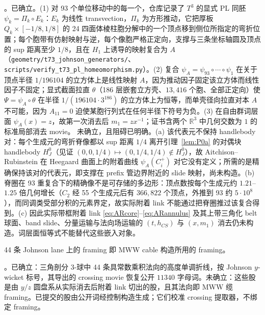 \begin{remark}
\Open。已确立。(1) 对 93 个单位移动中的每一个，仓库记录了 $T^3$ 的显式 PL 同胚 $\psi_k=\Pi_k\circ E_k$：$E_k$ 为线性 transvection，$\Pi_k$ 为方形推动，它把厚板 $Q_k\times[-1/8,1/8]$ 的 24 四面体棱柱胞分解中的一个顶点移到侧位所指定的弯折位置；每个胞带有仿射映射与逆，每个像胞严格正定向，支撑与三条坐标轴圆及顶点的 sup 距离至少 $1/8$，且在 $H_1$ 上诱导的映射复合为 $A$（\texttt{geometry/t73\_johnson\_generators/}、\texttt{scripts/verify\_t73\_pl\_homeomorphism.py}）。(2) 复合 $\psi_A=\psi_{93}\circ\cdots\circ\psi_1$ 在关于顶点半径 $1/196104$ 的立方体上是线性映射 $A$，因为推动因子固定该立方体而线性因子不固定；显式截面拉直 $\theta$（186 层嵌套立方壳、$13{,}416$ 个胞、全部正定向）使 $\Psi=\psi_A\circ\theta$ 在半径 $1/(196104\cdot3^{186})$ 的立方体上为恒等，而单壳径向拉直对本 $A$ 不可能，因为 $A_{11}=0$ 迫使某胞行列式在任何半径下符号为负。(3) 在自由群词层面 $\psi_A(x)=z$，故第一次消去后 $m_1=zx^{-1}$；证书含两个 $\mathbb R^3$ 中几何交数为 $1$ 的标准局部消去 movie。
未确立，且阻碍已明确。(a) 该代表元不保持 handlebody 对：每个生成元的弯折脊像都以 sup 距离 $1/4$ 离开引理~\ref{lem:P0a} 的对偶块 handlebody $H_J^0$（见证 $(0,0,1/4)\mapsto(0,1/4,1/4)\notin H_J^0$），故 Aitchison--Rubinstein 在 Heegaard 曲面上的附着曲线 $\psi_A(C_i^+)$ 对它没有定义；所需的是精确保持该对的代表元，即支撑在 prefix 管边界附近的 slide 映射，尚未构造。(b) 脊圈在 93 重复合下的精确像不是可存储的多边形：顶点数按每个生成元约 $1.21$--$1.25$ 倍几何增长（$C_2$ 经 55 个生成元后有 $366{,}822$ 个顶点，外推到 93 约 $5\cdot10^8$），而同调类受部分积的元素界定，故实际附着 link 不能通过把脊圈推过该复合得到。(c) 因此实际带框附着 link \eqref{eq:ARcore}--\eqref{eq:ARannulus} 及其上带三角化 belt 球面、band slide、分量运输与法向场运输的 $(t,h_{CS})$ 与 $(x,m_1)$ 消去仍未构造。词层面恒等式不能替代这些嵌入对象。
\end{remark}

\begin{lemma}\label{lem:P0c}
44 条 Johnson lane 上的 framing 即 MWW cable
构造所用的 framing。
\end{lemma}

\begin{remark}
\Open。已确立：三角剖分 $3$-球中 44 条具常数乘积法向的高度单调折线，按 Johnson $y$-wicket 标号，其导出的 crossing movie 恢复公开 $11340$ 字母词。未确立：这些股是由 $y/z$ 圆盘系从实际消去后附着 link 切出的股，且其法向即 MWW 缆 framing。已提交的股由公开词经控制构造生成；它们校准 crossing 提取器，不绑定 framing。
\end{remark}

